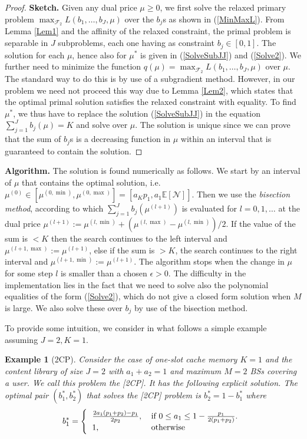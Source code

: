 \documentclass[conference,twocolum,final]{IEEEtran}
\newtheorem{Exm}{Example}
\begin{document}
\begin{proof}
\textbf{Sketch.} Given any dual price $\mu\geq 0$, we first solve the relaxed primary problem $\max_{\mathcal{F}_2}L\left(b_1,\ldots,b_J,\mu\right)$ over the $b_j$s as shown in (\ref{MinMaxL}). From Lemma \ref{Lem1} and the affinity of the relaxed constraint, the primal problem is separable in $J$ subproblems, each one having as constraint $b_j\in\left[0,1\right]$. The solution for each $\mu$, hence also for $\mu^*$ is given in (\ref{SolveSubJJ}) and (\ref{Solve2}). We further need to minimize the function $q\left(\mu\right)=\max_{\mathcal{F}_2}L\left(b_1,\ldots,b_J,\mu\right)$ over $\mu$. The standard way to do this is by use of a subgradient method. However, in our problem we need not proceed this way due to Lemma \ref{Lem2}, which states that the optimal primal solution satisfies the relaxed constraint with equality. To find $\mu^*$, we thus have to replace the solution (\ref{SolveSubJJ}) in the equation $\sum_{j=1}^Jb_j\left(\mu\right)=K$ and solve over $\mu$. The solution is unique since we can prove that the sum of $b_j$s is a decreasing function in $\mu$ within an interval that is guaranteed to contain the solution.
\end{proof}
\textbf{Algorithm.} The solution is found numerically as follows. We start by an interval of $\mu$ that contains the optimal solution, i.e. $\mu^{(0)}\in\left[\mu^{(0,\min)},\mu^{(0,\max)}\right]=\left[a_Kp_1,a_1\mathbb{E}\left[\mathcal{N}\right]\right]$. Then we use the \textit{bisection method}, according to 
which $\sum_{j=1}^J b_j\left(\mu^{(l+1)}\right)$ is evaluated for $l=0,1,\ldots$ at the dual price 
$\mu^{(l+1)}:=\mu^{(l,\min)}+(\mu^{(l,\max)}-\mu^{(l,\min)})/2$.
If the value of the sum is $<K$ then the search continues to the left interval and $\mu^{(l+1,\max)}:=\mu^{(l+1)}$, else if the sum is $>K$, the search continues to the right interval and $\mu^{(l+1,\min)}:=\mu^{(l+1)}$. The algorithm stops when the change in $\mu$ for some step $l$ is smaller than a chosen $\epsilon>0$. The difficulty in the implementation lies in the fact that we need to solve also the polynomial equalities of the form (\ref{Solve2}), which do not give a closed form solution when $M$ is large. We also solve these over $b_j$ by use of the bisection method. 


To provide some intuition, we consider in what follows a simple example assuming $J=2, K=1$.
\begin{Exm}[2CP]\label{Cor1}
Consider the case of one-slot cache memory $K=1$ and the  content library of size $J=2$ with $a_1+a_2=1$ and maximum $M=2$ BSs covering a user. We call this problem the [2CP]. It has the following explicit solution.
The optimal pair $(b_1^*,b_2^*)$ that solves the [2CP] problem is $b_2^*=1-b_1^*$ where
\begin{eqnarray}
\label{OFD2++}
b_1^* =\left\{\begin{tabular}{l l}
$\frac{2a_1\left(p_1+p_2\right)-p_1}{2p_2}$, & if $0 \leq a_1\leq 1-\frac{p_1}{2(p_1+p_2)}$.\\
$1$, & otherwise
\end{tabular}\right.
\end{eqnarray}
\end{Exm}
\end{document}

